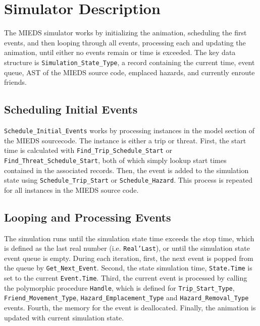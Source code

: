 \documentclass[12pt,letterpaper,titlepage]{article}
\newcommand{\code}[1]{\texttt{#1}}
\newcommand{\mieds}[0]{\textsc{MIEDS}}
\begin{document}

\doublespacing

\section{Simulator Description}

The \mieds{} simulator works by initializing the animation, scheduling
the first events, and then looping through all events, processing each
and updating the animation, until either no events remain or time is
exceeded.  The key data structure is \code{Simulation_State_Type}, a
record containing the current time, event queue, AST of the \mieds
source code, emplaced hazards, and currently enroute friends.

\subsection{Scheduling Initial Events}

\code{Schedule_Initial_Events} works by processing instances in the
model section of the \mieds{} sourcecode.  The instance is either a
trip or threat.  First, the start time is calculated with
\code{Find_Trip_Schedule_Start} or \code{Find_Threat_Schedule_Start},
both of which simply lookup start times contained in the associated
records.  Then, the event is added to the simulation state using
\code{Schedule_Trip_Start} or \code{Schedule_Hazard}.  This process is
repeated for all instances in the \mieds{} source code.

\subsection{Looping and Processing Events}

The simulation runs until the simulation state time exceeds the stop
time, which is defined as the last real number
(i.e. \code{Real'Last}), or until the simulation state event queue is
empty.  During each iteration, first, the next event is popped from
the queue by \code{Get_Next_Event}.  Second, the state simulation
time, \code{State.Time} is set to the current \code{Event.Time}.
Third, the current event is processed by calling the polymorphic
procedure \code{Handle}, which is defined for \code{Trip_Start_Type},
\code{Friend_Movement_Type}, \code{Hazard_Emplacement_Type} and
\code{Hazard_Removal_Type} events.  Fourth, the memory for the event
is deallocated.  Finally, the animation is updated with current
simulation state.
\end{document}
